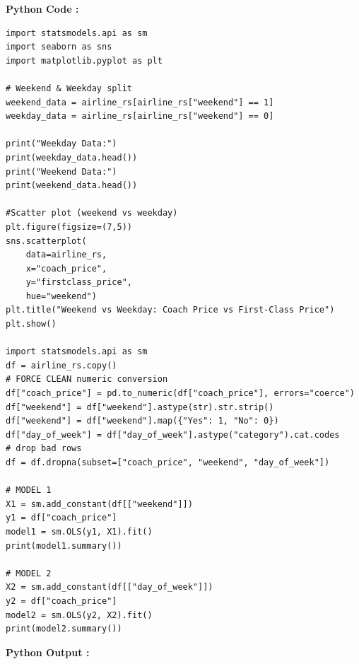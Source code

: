 \documentclass[11pt,a4paper]{article}
\begin{document}
\vspace{0.5em}
\noindent \textbf{Python Code :}
\begin{lstlisting}[style=Pythonstyle]
import statsmodels.api as sm
import seaborn as sns
import matplotlib.pyplot as plt

# Weekend & Weekday split
weekend_data = airline_rs[airline_rs["weekend"] == 1]
weekday_data = airline_rs[airline_rs["weekend"] == 0]

print("Weekday Data:")
print(weekday_data.head())
print("Weekend Data:")
print(weekend_data.head())

#Scatter plot (weekend vs weekday)
plt.figure(figsize=(7,5))
sns.scatterplot(
    data=airline_rs,
    x="coach_price",
    y="firstclass_price",
    hue="weekend")
plt.title("Weekend vs Weekday: Coach Price vs First-Class Price")
plt.show()

import statsmodels.api as sm
df = airline_rs.copy()
# FORCE CLEAN numeric conversion
df["coach_price"] = pd.to_numeric(df["coach_price"], errors="coerce")
df["weekend"] = df["weekend"].astype(str).str.strip()
df["weekend"] = df["weekend"].map({"Yes": 1, "No": 0})
df["day_of_week"] = df["day_of_week"].astype("category").cat.codes
# drop bad rows
df = df.dropna(subset=["coach_price", "weekend", "day_of_week"])

# MODEL 1
X1 = sm.add_constant(df[["weekend"]])
y1 = df["coach_price"]
model1 = sm.OLS(y1, X1).fit()
print(model1.summary())

# MODEL 2
X2 = sm.add_constant(df[["day_of_week"]])
y2 = df["coach_price"]
model2 = sm.OLS(y2, X2).fit()
print(model2.summary())
\end{lstlisting}
\vspace{0.5em}
\newpage
\noindent \textbf{Python Output :}
\end{document}
